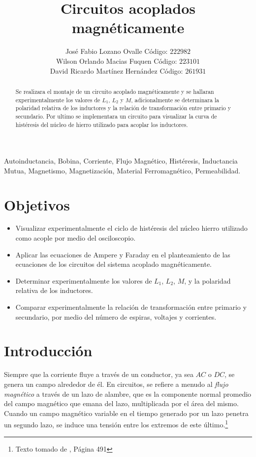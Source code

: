 \documentclass[twocolumn]{IEEEtran}
\begin{document}
\title{Circuitos acoplados magnéticamente}
\author{José Fabio Lozano Ovalle Código: $222982$\\
	Wilson Orlando Macias Fuquen Código: $223101$\\
	David Ricardo Martínez Hernández Código: $261931$}
\maketitle
{}
\begin{abstract}
Se realizara el montaje de un circuito acoplado magnéticamente y se hallaran experimentalmente los valores de $L_1$, $L_2$ y $M$, adicionalmente se determinara la polaridad relativa de los inductores y la relación de transformación entre primario y secundario. Por ultimo se implementara un circuito para  visualizar la curva de histéresis del núcleo de hierro utilizado para acoplar los inductores.
\end{abstract}
\begin{keywords}
Autoinductancia, Bobina, Corriente, Flujo Magnético, Histéresis, Inductancia Mutua, Magnetismo, Magnetización, Material Ferromagnético, Permeabilidad.
\end{keywords}

\section{Objetivos}
\begin{itemize}
 \item Visualizar experimentalmente el ciclo de histéresis del núcleo hierro utilizado como acople por medio del osciloscopio.
 \item Aplicar las ecuaciones de Ampere y Faraday en el planteamiento de las ecuaciones de los circuitos del sistema acoplado magnéticamente.
 \item Determinar experimentalmente los valores de $L_1$, $L_2$, $M$, y la polaridad relativa de los inductores.
 \item Comparar experimentalmente la relación de transformación entre primario y secundario, por medio del número de espiras, voltajes y corrientes.
\end{itemize}

\section{Introducción}
\noindent
Siempre que la corriente fluye a través de un conductor, ya sea $AC$ o $DC$, se genera un campo alrededor de él. En circuitos, se refiere a menudo al \textit{flujo magnético} a través de un lazo de alambre, que es la componente normal promedio del campo magnético que emana del lazo, multiplicada por el área del mismo. Cuando un campo magnético variable en el tiempo generado por un lazo penetra un segundo lazo, se induce una tensión entre los extremos de este último.\footnote{Texto tomado de \cite{hayt}, Página 491}
\end{document}

